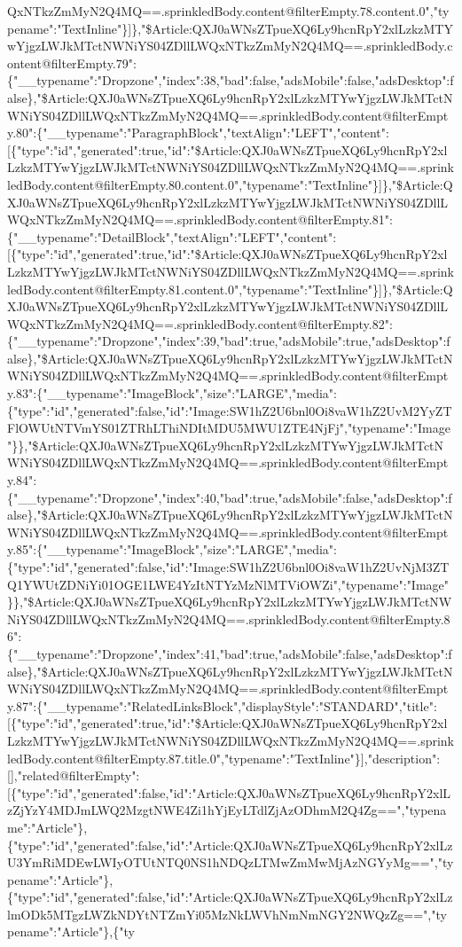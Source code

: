 QxNTkzZmMyN2Q4MQ==.sprinkledBody.content@filterEmpty.78.content.0","typename":"TextInline"\}{]}\},"\$Article:QXJ0aWNsZTpueXQ6Ly9hcnRpY2xlLzkzMTYwYjgzLWJkMTctNWNiYS04ZDllLWQxNTkzZmMyN2Q4MQ==.sprinkledBody.content@filterEmpty.79":\{"\_\_typename":"Dropzone","index":38,"bad":false,"adsMobile":false,"adsDesktop":false\},"\$Article:QXJ0aWNsZTpueXQ6Ly9hcnRpY2xlLzkzMTYwYjgzLWJkMTctNWNiYS04ZDllLWQxNTkzZmMyN2Q4MQ==.sprinkledBody.content@filterEmpty.80":\{"\_\_typename":"ParagraphBlock","textAlign":"LEFT","content":{[}\{"type":"id","generated":true,"id":"\$Article:QXJ0aWNsZTpueXQ6Ly9hcnRpY2xlLzkzMTYwYjgzLWJkMTctNWNiYS04ZDllLWQxNTkzZmMyN2Q4MQ==.sprinkledBody.content@filterEmpty.80.content.0","typename":"TextInline"\}{]}\},"\$Article:QXJ0aWNsZTpueXQ6Ly9hcnRpY2xlLzkzMTYwYjgzLWJkMTctNWNiYS04ZDllLWQxNTkzZmMyN2Q4MQ==.sprinkledBody.content@filterEmpty.81":\{"\_\_typename":"DetailBlock","textAlign":"LEFT","content":{[}\{"type":"id","generated":true,"id":"\$Article:QXJ0aWNsZTpueXQ6Ly9hcnRpY2xlLzkzMTYwYjgzLWJkMTctNWNiYS04ZDllLWQxNTkzZmMyN2Q4MQ==.sprinkledBody.content@filterEmpty.81.content.0","typename":"TextInline"\}{]}\},"\$Article:QXJ0aWNsZTpueXQ6Ly9hcnRpY2xlLzkzMTYwYjgzLWJkMTctNWNiYS04ZDllLWQxNTkzZmMyN2Q4MQ==.sprinkledBody.content@filterEmpty.82":\{"\_\_typename":"Dropzone","index":39,"bad":true,"adsMobile":true,"adsDesktop":false\},"\$Article:QXJ0aWNsZTpueXQ6Ly9hcnRpY2xlLzkzMTYwYjgzLWJkMTctNWNiYS04ZDllLWQxNTkzZmMyN2Q4MQ==.sprinkledBody.content@filterEmpty.83":\{"\_\_typename":"ImageBlock","size":"LARGE","media":\{"type":"id","generated":false,"id":"Image:SW1hZ2U6bnl0Oi8vaW1hZ2UvM2YyZTFlOWUtNTVmYS01ZTRhLThiNDItMDU5MWU1ZTE4NjFj","typename":"Image"\}\},"\$Article:QXJ0aWNsZTpueXQ6Ly9hcnRpY2xlLzkzMTYwYjgzLWJkMTctNWNiYS04ZDllLWQxNTkzZmMyN2Q4MQ==.sprinkledBody.content@filterEmpty.84":\{"\_\_typename":"Dropzone","index":40,"bad":true,"adsMobile":false,"adsDesktop":false\},"\$Article:QXJ0aWNsZTpueXQ6Ly9hcnRpY2xlLzkzMTYwYjgzLWJkMTctNWNiYS04ZDllLWQxNTkzZmMyN2Q4MQ==.sprinkledBody.content@filterEmpty.85":\{"\_\_typename":"ImageBlock","size":"LARGE","media":\{"type":"id","generated":false,"id":"Image:SW1hZ2U6bnl0Oi8vaW1hZ2UvNjM3ZTQ1YWUtZDNiYi01OGE1LWE4YzItNTYzMzNlMTViOWZi","typename":"Image"\}\},"\$Article:QXJ0aWNsZTpueXQ6Ly9hcnRpY2xlLzkzMTYwYjgzLWJkMTctNWNiYS04ZDllLWQxNTkzZmMyN2Q4MQ==.sprinkledBody.content@filterEmpty.86":\{"\_\_typename":"Dropzone","index":41,"bad":true,"adsMobile":false,"adsDesktop":false\},"\$Article:QXJ0aWNsZTpueXQ6Ly9hcnRpY2xlLzkzMTYwYjgzLWJkMTctNWNiYS04ZDllLWQxNTkzZmMyN2Q4MQ==.sprinkledBody.content@filterEmpty.87":\{"\_\_typename":"RelatedLinksBlock","displayStyle":"STANDARD","title":{[}\{"type":"id","generated":true,"id":"\$Article:QXJ0aWNsZTpueXQ6Ly9hcnRpY2xlLzkzMTYwYjgzLWJkMTctNWNiYS04ZDllLWQxNTkzZmMyN2Q4MQ==.sprinkledBody.content@filterEmpty.87.title.0","typename":"TextInline"\}{]},"description":{[}{]},"related@filterEmpty":{[}\{"type":"id","generated":false,"id":"Article:QXJ0aWNsZTpueXQ6Ly9hcnRpY2xlLzZjYzY4MDJmLWQ2MzgtNWE4Zi1hYjEyLTdlZjAzODhmM2Q4Zg==","typename":"Article"\},\{"type":"id","generated":false,"id":"Article:QXJ0aWNsZTpueXQ6Ly9hcnRpY2xlLzU3YmRiMDEwLWIyOTUtNTQ0NS1hNDQzLTMwZmMwMjAzNGYyMg==","typename":"Article"\},\{"type":"id","generated":false,"id":"Article:QXJ0aWNsZTpueXQ6Ly9hcnRpY2xlLzlmODk5MTgzLWZkNDYtNTZmYi05MzNkLWVhNmNmNGY2NWQzZg==","typename":"Article"\},\{"ty